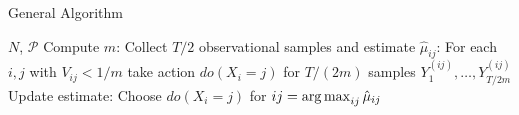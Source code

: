 \begin{algorithm}[H]
\caption{General Algorithm}
\begin{algorithmic}
 $N$, $\mathcal P$
\STATE Compute $m$:
\STATE Collect $T/2$ observational samples and estimate $\hat \mu_{ij}$:
\STATE For each $i,j $ with $V_{ij} < 1/m$ take action $do(X_i = j)$ for $T/(2m)$ samples $Y^{(ij)}_1,\ldots,Y^{(ij)}_{T/2m}$
\STATE Update estimate:
\ENDFOR
\STATE Choose $do(X_i = j)$ for $ij = \argmax_{ij} \hat \mu_{ij}$
\end{algorithmic}
\end{algorithm}






